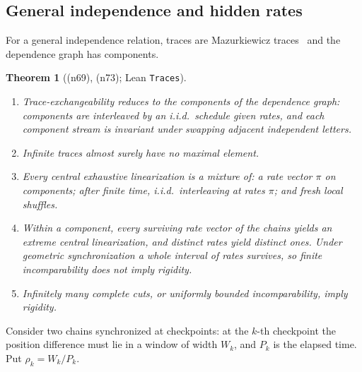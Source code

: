 \documentclass[11pt]{article}
\newtheorem{theorem}{Theorem}[section]
\theoremstyle{definition}
\theoremstyle{remark}
\newcommand{\lean}[1]{\texttt{#1}}
\newcommand{\note}[1]{\textsf{(n#1)}}
\begin{document}
\subsection{General independence and hidden rates}

For a general independence relation, traces are Mazurkiewicz traces~\cite{Mazurkiewicz77,DiekertRozenberg95} and the dependence graph has components.

\begin{theorem}[\note{69}, \note{73}; Lean \lean{Traces}]
\leavevmode
\begin{enumerate}
\item Trace-exchangeability reduces to the components of the dependence graph: components are interleaved by an i.i.d.\ schedule given rates, and each component stream is invariant under swapping adjacent independent letters.
\item Infinite traces almost surely have no maximal element.
\item Every central exhaustive linearization is a mixture of: a rate vector $\pi$ on components; after finite time, i.i.d.\ interleaving at rates $\pi$; and fresh local shuffles.
\item \emph{Within a component}, every surviving rate vector of the chains yields an extreme central linearization, and distinct rates yield distinct ones. Under geometric synchronization a whole interval of rates survives, so finite incomparability does not imply rigidity.
\item Infinitely many complete cuts, or uniformly bounded incomparability, imply rigidity.
\end{enumerate}
\end{theorem}

Consider two chains synchronized at checkpoints: at the $k$-th checkpoint the position difference must lie in a window of width $W_k$, and $P_k$ is the elapsed time. Put $\rho_k=W_k/P_k$.
\end{document}
